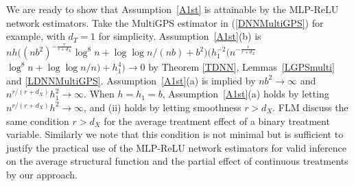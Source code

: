 \documentclass[lettersize, 12pt]{article}
\newtheorem{remark}{Remark}
\begin{document}
We are ready to show that Assumption~\ref{A1st} is attainable by the MLP-ReLU network estimators.
Take the MultiGPS estimator in (\ref{DNNMultiGPS}) for example, with $d_T=1$ for simplicity.
Assumption~\ref{A1st}(b) is
$nh
\Big( (nb^{2})^{-\frac{r}{r+d_X}}\log^8n  +\log\log n/(nb) + b^2 \Big)
\Big(
h_1^{-2}\big( n^{-\frac{r}{r+d_X}}$\\
$\log^8n  + \log\log n/n\big) + h_1^4 \Big)
\rightarrow 0$ 
by Theorem \ref{TDNN}, Lemmas~\ref{LGPSmulti} and \ref{LDNNMultiGPS}.
Assumption~\ref{A1st}(a) is implied by $nb^2\rightarrow\infty$ and $n^{r/(r+d_X)}h_1^2\rightarrow\infty$.
When $h = h_1 = b$, Assumption~\ref{A1st}(a) holds by letting $n^{r/(r+d_X)}h^2 \rightarrow\infty$, and (ii) holds by letting smoothness $r > {d_X}$.  
FLM discuss the same condition  $r > {d_X}$  for the average treatment effect of a binary treatment variable.
Similarly we note that this condition is not minimal but is sufficient to justify the practical use of the MLP-ReLU network estimators for valid inference on the average structural function and the partial effect of continuous treatments by our approach.

\end{document}
